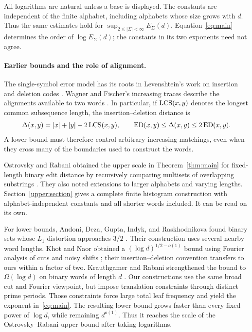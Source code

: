 All logarithms are natural unless a base is displayed. The constants are
independent of the finite alphabet, including alphabets whose size grows
with $d$. Thus the same estimates hold for
$\sup_{2\leq|\Sigma|<\infty}E_\Sigma(d)$. Equation~\eqref{eq:main}
determines the order of $\log E_\Sigma(d)$; the constants in its two
exponents need not agree.

\paragraph{Earlier bounds and the role of alignment.}
The single-symbol error model has its roots in Levenshtein's work on
insertion and deletion codes \cite{Levenshtein1966}. Wagner and Fischer's
increasing traces describe the alignments available to two words
\cite{WagnerFischer1974}. In particular, if $\operatorname{LCS}(x,y)$ denotes the longest
common subsequence length, the insertion--deletion distance is
\[
 \Delta(x,y)=|x|+|y|-2\operatorname{LCS}(x,y),\qquad
 \operatorname{ED}(x,y)\leq\Delta(x,y)\leq2\operatorname{ED}(x,y).
\]
A lower bound must therefore control arbitrary increasing matchings, even
when they cross many of the boundaries used to construct the words.

Ostrovsky and Rabani obtained the upper scale in Theorem~\ref{thm:main} for
fixed-length binary edit distance by recursively comparing multisets of
overlapping substrings \cite{OstrovskyRabani2007}. They also noted extensions
to larger alphabets and varying lengths. Section~\ref{upper:section} gives
a complete finite histogram construction with alphabet-independent constants
and all shorter words included. It can be read on its own.

For lower bounds, Andoni, Deza, Gupta, Indyk, and Raskhodnikova found binary
sets whose $L_1$ distortion approaches $3/2$
\cite{AndoniDezaGuptaIndykRaskhodnikova2003}. Their construction uses several
nearby word lengths. Khot and Naor obtained a
$(\log d)^{1/2-o(1)}$ bound using Fourier analysis of cuts and noisy shifts
\cite{KhotNaor2006}; their insertion--deletion convention transfers to ours
within a factor of two. Krauthgamer and Rabani strengthened the bound to
$\Omega(\log d)$ on binary words of length $d$
\cite[Theorem~1.3]{KrauthgamerRabani2009}. Our constructions use the same
broad cut and Fourier viewpoint, but impose translation constraints through
distinct prime periods. Those constraints force large total leaf frequency
and yield the exponent in~\eqref{eq:main}. The resulting lower bound grows
faster than every fixed power of $\log d$, while remaining $d^{o(1)}$.
Thus it reaches the scale of the Ostrovsky--Rabani upper bound after taking
logarithms.

